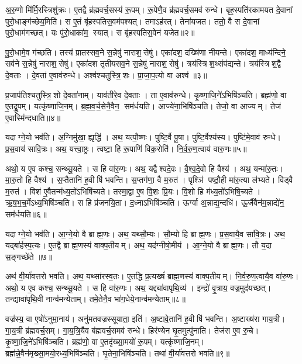 अ॒रु॒णो मि॑र्मि॒रस्त्रिशु॑क्रः। ए॒तद्वै ब्र॑ह्मवर्च॒सस्य॑ रू॒पम्। रू॒पेणै॒व ब्र॑ह्मवर्च॒समव॑ रुन्धे। बृह॒स्पति॑रकामयत दे॒वानां पुरो॒धाङ्ग॑च्छेय॒मिति॑। स ए॒तं बृ॑हस्पतिस॒वम॑पश्यत्। तमाऽह॑रत्। तेना॑यजत। ततो॒ वै स दे॒वानां पुरो॒धाम॑गच्छत्। यः पु॑रो॒धाका॑म॒ स्यात्। स बृ॑हस्पतिस॒वेन॑ यजेत॥२॥

पु॒रो॒धामे॒व ग॑च्छति। तस्य॑ प्रातस्सव॒ने स॒न्नेषु॑ नाराश॒सेषु॑। एका॑दश॒ दख्षि॑णा नीयन्ते। एका॑दश॒ माध्य॑न्दिने॒ सव॑ने स॒न्नेषु॑ नाराश॒सेषु॑। एका॑दश तृतीयसव॒ने स॒न्नेषु॑ नाराश॒सेषु॑। त्रय॑स्त्रिश॒थ्संप॑द्यन्ते। त्रय॑स्त्रिश॒द्वै दे॒वताः। दे॒वता॑ ए॒वाव॑रुन्धे। अश्व॑श्चतुस्त्रि॒शः। प्रा॒जा॒प॒त्यो वा अश्व॑॥३॥

प्र॒जाप॑तिश्चतुस्त्रि॒शो दे॒वता॑नाम्। याव॑तीरे॒व दे॒वताः। ता ए॒वाव॑रुन्धे। कृ॒ष्णा॒जि॒ने॑ऽभिषि॑ञ्चति। ब्रह्म॑णो॒ वा ए॒तद्रू॒पम्। यत्कृ॑ष्णाजि॒नम्। ब्र॒ह्म॒व॒र्च॒सेनै॒वैन॒ सम॑र्धयति। आज्ये॑ना॒भिषि॑ञ्चति। तेजो॒ वा आज्यम्। तेज॑ ए॒वास्मि॑न्दधाति॥४॥\anuvakamend[होता॑ भवति यजेत॒ वा अश्वो॑ दधाति]

यदाग्ने॒यो भव॑ति। अ॒ग्निमु॑खा॒ ह्यृद्धि॑। अथ॒ यत्पौ॒ष्णः। पुष्टि॒र्वै पू॒षा। पुष्टि॒र्वैश्य॑स्य। पुष्टि॑मे॒वाव॑ रुन्धे। प्र॒स॒वाय॑ सावि॒त्रः। अथ॒ यत्त्वा॒ष्ट्रः। त्वष्टा॒ हि रू॒पाणि॑ विक॒रोति॑। नि॒र्व॒रु॒ण॒त्वाय॑ वारु॒णः॥५॥

अथो॒ य ए॒व कश्च॒ सन्थ्सू॒यते। स हि वा॑रु॒णः। अथ॒ यद्वैश्वदे॒वः। वै॒श्व॒दे॒वो हि वैश्य॑। अथ॒ यन्मा॑रु॒तः। मा॒रु॒तो हि वैश्य॑। स॒प्तैतानि॑ ह॒वीषि॑ भवन्ति। स॒प्तग॑णा॒ वै म॒रुत॑। पृश्ञि॑ पष्ठौ॒ही मा॑रु॒त्या ल॑भ्यते। विड्वै म॒रुत॑। विश॑ ए॒वैतन्म॑ध्य॒तो॑ऽभिषि॑च्यते। तस्मा॒द्वा ए॒ष वि॒शः प्रि॒यः। वि॒शो हि म॑ध्य॒तो॑ऽभिषि॒च्यते। ऋ॒ष॒भ॒च॒र्मेऽध्य॒भिषि॑ञ्चति। स हि प्र॑जनयि॒ता। द॒ध्नाऽभिषि॑ञ्चति। ऊर्ग्वा अ॒न्नाद्य॒न्दधि॑। ऊ॒र्जैवैन॑म॒न्नाद्ये॑न॒ सम॑र्धयति॥६॥\anuvakamend[वा॒रु॒णो विड्वै म॒रुतो॒ऽष्टौ च॑]

यदाग्ने॒यो भव॑ति। आ॒ग्ने॒यो वै ब्राह्म॒णः। अथ॒ यथ्सौ॒म्यः। सौ॒म्यो हि ब्राह्म॒णः। प्र॒स॒वायै॒व सा॑वि॒त्रः। अथ॒ यद्बा॑र्\mbox{}हस्प॒त्यः। ए॒तद्वै ब्राह्म॒णस्य॑ वाक्प॒तीयम्। अथ॒ यद॑ग्नीषो॒मीय॑। आ॒ग्ने॒यो वै ब्राह्म॒णः। तौ य॒दा स॒ङ्गच्छे॑ते ॥७॥

अथ॑ वी॒र्या॑वत्तरो भवति। अथ॒ यथ्सा॑रस्व॒तः। ए॒तद्धि प्र॒त्यख्षं॑ ब्राह्म॒णस्य॑ वाक्प॒तीयम्। नि॒र्व॒रु॒ण॒त्वायै॒व वा॑रु॒णः। अथो॒ य ए॒व कश्च॒ सन्थ्सू॒यते। स हि वा॑रु॒णः। अथ॒ यद्द्या॑वापृथि॒व्य॑। इन्द्रो॑ वृ॒त्राय॒ वज्र॒मुद॑यच्छत्। तन्द्यावा॑पृथि॒वी नान्व॑मन्येताम्। तमे॒तेनै॒व भा॑ग॒धेये॒नान्व॑मन्येताम्॥८॥

वज्र॑स्य॒ वा ए॒षो॑ऽनुमा॒नाय॑। अनु॑मतवज्रस्सूयाता॒ इति॑। अ॒ष्टावे॒तानि॑ ह॒वीषि॑ भवन्ति। अ॒ष्टाख्ष॑रा गाय॒त्री। गा॒य॒त्री ब्र॑ह्मवर्च॒सम्। गा॒य॒त्रि॒यैव ब॑ह्मवर्च॒समव॑ रुन्धे। हिर॑ण्येन घृ॒तमुत्पु॑नाति। तेज॑स ए॒व रु॒चे। कृ॒ष्णा॒जि॒ने॑ऽभिषि॑ञ्चति। ब्रह्म॑णो॒ वा ए॒तदृ॑ख्सा॒मयो॑ रू॒पम्। यत्कृ॑ष्णाजि॒नम्। ब्रह्म॑न्ने॒वैन॑मृख्सा॒मयो॒रध्य॒भिषि॑ञ्चति। घृ॒तेना॒भिषि॑ञ्चति। तथा॑ वी॒र्या॑वत्तरो भवति॥९॥\anuvakamend[स॒ङ्गच्छे॑ते भाग॒धेये॒नान्व॑मन्येता रू॒पञ्च॒त्वारि॑ च]

